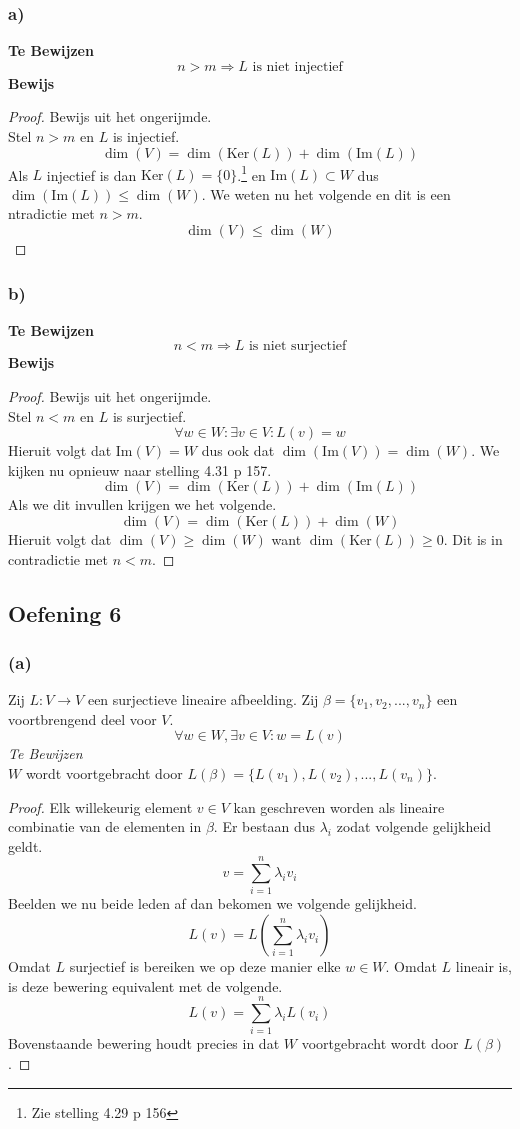 \documentclass[lineaire_algebra_oplossingen.tex]{subfiles}
\begin{document}
\subsubsection*{a)}
\textbf{Te Bewijzen}
\[
n > m \Rightarrow L \text{ is niet injectief}
\]
\textbf{Bewijs}
\begin{proof}
Bewijs uit het ongerijmde.\\
Stel $n>m$ en $L$ is injectief.
\[
\dim (V) = \dim (\text{Ker}(L)) + \dim (\text{Im}(L))
\]
Als $L$ injectief is dan $\text{Ker}(L)=\{0\}$.\footnote{Zie stelling 4.29 p 156} en $\text{Im}(L) \subset W$ dus $\dim (\text{Im}(L))\le \dim (W)$. We weten nu het volgende en dit is een ntradictie met $n>m$.
\[
\dim (V) \le \dim (W)
\]
\end{proof}
\subsubsection*{b)}
\textbf{Te Bewijzen}
\[
n < m \Rightarrow L \text{ is niet surjectief}
\]
\textbf{Bewijs}
\begin{proof}
Bewijs uit het ongerijmde.\\
Stel $n<m$ en $L$ is surjectief.
\[
\forall w\in W:\exists v\in V: L(v)=w
\]
Hieruit volgt dat $\text{Im}(V)=W$ dus ook dat $\dim (\text{Im}(V))=\dim (W)$.
We kijken nu opnieuw naar stelling 4.31 p 157.
\[
\dim (V) = \dim (\text{Ker}(L)) + \dim (\text{Im}(L))
\]
Als we dit invullen krijgen we het volgende.
\[
\dim (V) = \dim (\text{Ker}(L)) + \dim (W)
\]
Hieruit volgt dat $\dim (V) \ge \dim (W)$ want $\dim (\text{Ker}(L)) \ge 0$. Dit is in contradictie met $n<m$.
\end{proof}


\subsection{Oefening 6}
\subsubsection*{(a)}
Zij $L: V \rightarrow V$ een surjectieve lineaire afbeelding. Zij $\beta = \{v_1,v_2,...,v_n\}$ een voortbrengend deel voor $V$.
\[
\forall w \in W, \exists v \in V: w=L(v)
\]
\emph{Te Bewijzen}\\
$W$ wordt voortgebracht door $L(\beta) = \{L(v_1),L(v_2),...,L(v_n)\}$.
\begin{proof}
Elk willekeurig element $v\in V$ kan geschreven worden als lineaire combinatie van de elementen in $\beta$. Er bestaan dus $\lambda_i$ zodat volgende gelijkheid geldt.
\[
v = \sum_{i=1}^n\lambda_iv_i
\]
Beelden we nu beide leden af dan bekomen we volgende gelijkheid.
\[
L(v) = L\left(\sum_{i=1}^n\lambda_iv_i\right)
\]
Omdat $L$ surjectief is bereiken we op deze manier elke $w\in W$.
Omdat $L$ lineair is, is deze bewering equivalent met de volgende.
\[
L(v) = \sum_{i=1}^n\lambda_iL(v_i)
\]
Bovenstaande bewering houdt precies in dat $W$ voortgebracht wordt door $L(\beta)$.
\end{proof}
\end{document}
